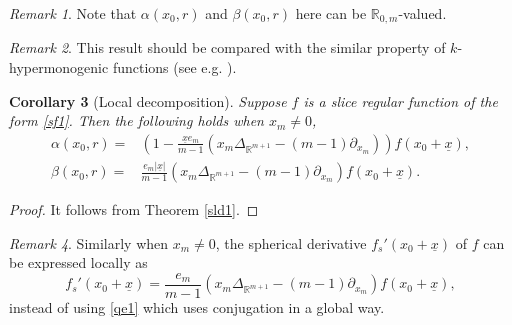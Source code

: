 \documentclass{amsart}
\newtheorem{theorem}{Theorem}[section]
\newtheorem{corollary}[theorem]{Corollary}
\theoremstyle{definition}
\theoremstyle{remark}
\newtheorem{remark}[theorem]{Remark}
\numberwithin{equation}{section}
\begin{document}
\begin{remark} Note that  $\alpha(x_{0}, r)$ and $\beta(x_{0}, r)$ here can be $\mathbb{R}_{0,m}$-valued.
\end{remark}
\begin{remark} This result should be compared with the similar property of $k$-hypermonogenic functions (see e.g. \cite{el23,eo}).

\end{remark}
\begin{corollary}[Local decomposition]  Suppose $f$ is a slice regular function of the form \eqref{sf1}. Then the following holds when $x_{m}\neq 0$,
\begin{equation*}
    \begin{split}
        \alpha(x_{0}, r)=& \left(1- \frac{\underline{x}e_{m}}{m-1}\left(x_{m}\Delta_{\mathbb{R}^{m+1}} -(m-1)\partial_{x_{m}}\right)\right)f(x_{0}+\underline{x}),\\
        \beta(x_{0},r)=& \frac{e_{m}|\underline{x}|}{m-1}\left(x_{m}\Delta_{\mathbb{R}^{m+1}} -(m-1) \partial_{x_{m}}\right)f(x_{0}+\underline{x}).
    \end{split}
\end{equation*}
\end{corollary}
\begin{proof}
    It follows from Theorem \ref{sld1}.
\end{proof}
\begin{remark} Similarly when $x_{m}\neq 0$,  the  spherical derivative $f_{s}'(x_{0}+\underline{x})$ of $f$ can be expressed  locally as
\begin{equation*}
    f_{s}'(x_{0}+\underline{x})=\frac{e_{m}}{m-1} \left(x_{m}\Delta_{\mathbb{R}^{m+1}} -(m-1) \partial_{x_{m}}\right)f(x_{0}+\underline{x}),
\end{equation*}
instead of using \eqref{qe1} which uses conjugation in a global way.
\end{remark}
\end{document}
